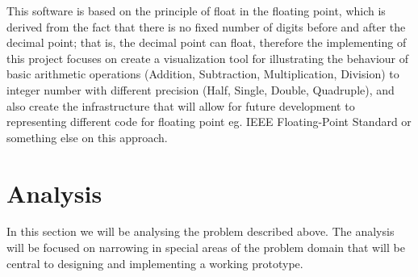 \documentclass[11pt]{article}
\begin{document}
This software is based on the principle of float in the floating point, which is derived from the fact that there is no fixed number of digits before and after the decimal point; that is, the decimal point can float, therefore the implementing of this project focuses on create a visualization tool for illustrating the behaviour of basic arithmetic operations (Addition, Subtraction, Multiplication, Division) to integer number with different precision (Half, Single, Double, Quadruple), and also create the infrastructure that will allow for future development to representing different code for floating point eg. IEEE Floating-Point Standard or something else on this approach.

\section{Analysis}
In this section we will be analysing the problem described above. The analysis will be focused on narrowing in special areas of the problem domain that will be central to designing and implementing a working prototype.
\end{document}

